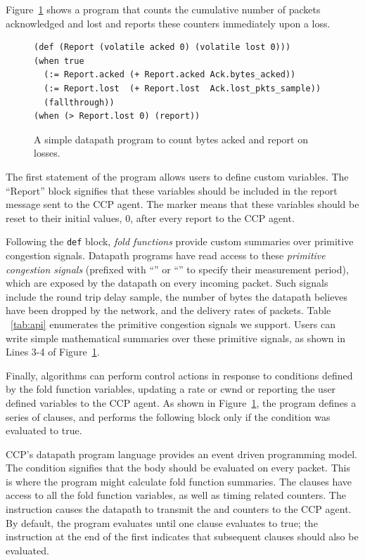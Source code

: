 Figure~\ref{lst:design:simple_datapath_prog} shows a program that counts the cumulative number of packets acknowledged and lost and reports these counters immediately upon a loss.
\begin{figure}[t]
{\footnotesize
\begin{verbatim}
(def (Report (volatile acked 0) (volatile lost 0)))
(when true
  (:= Report.acked (+ Report.acked Ack.bytes_acked))
  (:= Report.lost  (+ Report.lost  Ack.lost_pkts_sample))
  (fallthrough))
(when (> Report.lost 0) (report))
\end{verbatim}
\caption{A simple datapath program to count bytes acked and report on losses.} \label{lst:design:simple_datapath_prog}
}
\end{figure}
The first statement of the program allows users to define custom variables.
The ``Report'' block signifies that these variables should be included in the report message sent to the CCP agent.
The  marker means that these variables should be reset to their initial values, 0, after every report to the CCP agent.

Following the \texttt{def} block, \textit{fold functions} provide custom summaries over primitive congestion signals.
Datapath programs have read access to these \textit{primitive congestion signals} (prefixed with ``'' or ``'' to specify their measurement period), which are exposed by the datapath on every incoming packet. Such signals include the round trip delay sample, the number of bytes the datapath believes have been dropped by the network, and the delivery rates of packets. Table ~\ref{tab:api} enumerates the primitive congestion signals we support.
Users can write simple mathematical summaries over these primitive signals, as shown in Lines 3-4 of Figure~\ref{lst:design:simple_datapath_prog}.

Finally, algorithms can perform control actions in response to conditions defined by the fold function variables, \eg updating a rate or cwnd or reporting the user defined variables to the CCP agent.
As shown in Figure~\ref{lst:design:simple_datapath_prog}, the program defines a series of  clauses, and performs the following block only if the condition was evaluated to true.

CCP's datapath program language provides an event driven programming model.
The condition  signifies that the body should be evaluated on every packet.
This is where the program might calculate fold function summaries.
The  clauses have access to all the fold function variables, as well as timing related counters.
The  instruction causes the datapath to transmit the  and  counters to the CCP agent.
By default, the program evaluates until one  clause evaluates to true; the  instruction at the end of the first  indicates that subsequent  clauses should also be evaluated.

